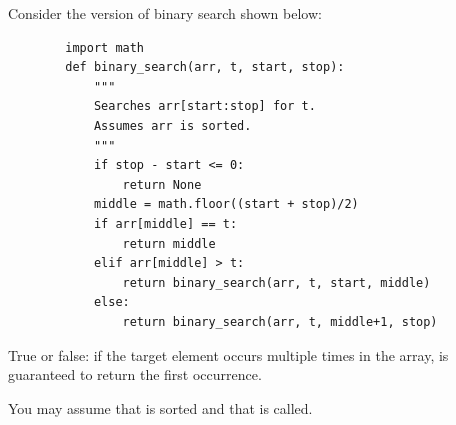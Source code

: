 \begin{prob}
    Consider the version of binary search shown below:

    \begin{verbatim}
        import math
        def binary_search(arr, t, start, stop):
            """
            Searches arr[start:stop] for t.
            Assumes arr is sorted.
            """
            if stop - start <= 0:
                return None
            middle = math.floor((start + stop)/2)
            if arr[middle] == t:
                return middle
            elif arr[middle] > t:
                return binary_search(arr, t, start, middle)
            else:
                return binary_search(arr, t, middle+1, stop)
    \end{verbatim}

    True or false: if the target element  occurs multiple times
    in the array,  is guaranteed to return the first
    occurrence.

    You may assume that  is sorted and that
     is called.

    \tF{}

\end{prob}
